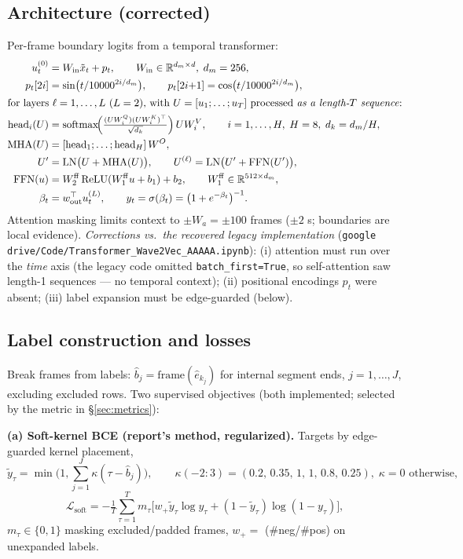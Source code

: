 \documentclass[10pt]{article}
\newcommand{\R}{\mathbb{R}}
\newcommand{\softmax}{\mathrm{softmax}}
\newcommand{\LN}{\mathrm{LN}}
\newcommand{\FFN}{\mathrm{FFN}}
\newcommand{\MHA}{\mathrm{MHA}}
\begin{document}
\subsection{Architecture (corrected)}
Per-frame boundary logits from a temporal transformer:
\begin{align}
u_t^{(0)} &= W_{\mathrm{in}} \tilde{x}_t + p_t, \qquad W_{\mathrm{in}} \in \R^{d_m \times d},\; d_m = 256,\\
p_t[2i] &= \sin\!\big(t / 10000^{2i/d_m}\big), \qquad p_t[2i{+}1] = \cos\!\big(t / 10000^{2i/d_m}\big),\\
\intertext{for layers $\ell = 1,\dots,L$ ($L=2$), with $U = [u_1;\dots;u_T]$ processed \emph{as a length-$T$ sequence}:}
\mathrm{head}_i(U) &= \softmax\!\Big(\tfrac{(U W_i^Q)(U W_i^K)^\top}{\sqrt{d_k}}\Big)\, U W_i^V, \qquad i = 1,\dots,H,\; H = 8,\; d_k = d_m/H,\\
\MHA(U) &= [\mathrm{head}_1;\dots;\mathrm{head}_H]\, W^{O},\\
U' &= \LN\big(U + \MHA(U)\big), \qquad
U^{(\ell)} = \LN\big(U' + \FFN(U')\big),\\
\FFN(u) &= W_2^{\mathrm{ff}}\,\mathrm{ReLU}(W_1^{\mathrm{ff}} u + b_1) + b_2, \qquad W_1^{\mathrm{ff}} \in \R^{512 \times d_m},\\
\beta_t &= w_{\mathrm{out}}^\top u_t^{(L)}, \qquad y_t = \sigma(\beta_t) = \big(1+e^{-\beta_t}\big)^{-1}.
\end{align}
Attention masking limits context to $\pm W_a = \pm 100$ frames ($\pm 2$ s; boundaries are local evidence). \emph{Corrections vs.\ the recovered legacy implementation} (\texttt{google drive/Code/Transformer\_Wave2Vec\_AAAAA.ipynb}): (i) attention must run over the \emph{time} axis (the legacy code omitted \texttt{batch\_first=True}, so self-attention saw length-1 sequences --- no temporal context); (ii) positional encodings $p_t$ were absent; (iii) label expansion must be edge-guarded (below).

\subsection{Label construction and losses}
Break frames from labels: $\hat{b}_j = \mathrm{frame}(\hat{e}_{k_j})$ for internal segment ends, $j = 1,\dots,J$, excluding excluded rows. Two supervised objectives (both implemented; selected by the metric in \S\ref{sec:metrics}):

\textbf{(a) Soft-kernel BCE (report's method, regularized).} Targets by edge-guarded kernel placement,
\begin{equation}
\tilde{y}_\tau = \min\Big(1, \sum_{j=1}^J \kappa(\tau - \hat{b}_j)\Big), \qquad
\kappa(-2{:}3) = (0.2,\, 0.35,\, 1,\, 1,\, 0.8,\, 0.25),\; \kappa = 0 \text{ otherwise},
\end{equation}
\begin{equation}
\mathcal{L}_{\mathrm{soft}} = -\tfrac{1}{T}\textstyle\sum_{\tau=1}^{T} m_\tau \big[ w_+ \tilde{y}_\tau \log y_\tau + (1-\tilde{y}_\tau)\log(1-y_\tau) \big],
\end{equation}
$m_\tau \in \{0,1\}$ masking excluded/padded frames, $w_+ = $ (\#neg/\#pos) on unexpanded labels.
\end{document}
